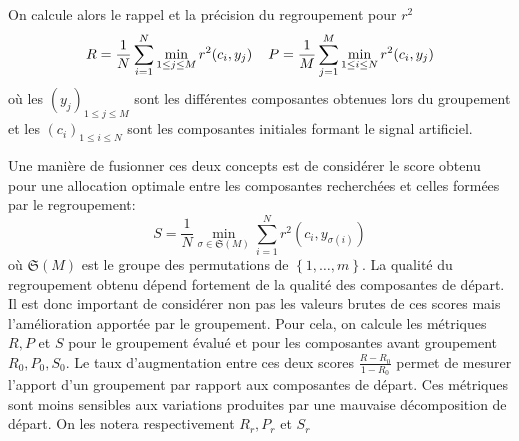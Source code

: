 \documentclass{gretsi}
\newcommand{\set}[1]{\left \{ 1, \dots, #1 \right \}}
\begin{document}
    On calcule alors le rappel et la précision du regroupement pour $r^2$
    \begin{equation}
        R = \frac{1}{N} \sum_{i=1}^N \min_{1\le j\le M} r^2(c_i, y_j) \hspace{0.4cm} P = \frac{1}{M}\sum_{j=1}^M \min_{1\le i\le N} r^2(c_i, y_j)
    \end{equation}
    où les $( y_j)_{1\le j \le M}$ sont les différentes composantes obtenues lors du groupement et les $(c_i)_{1\le i\le N}$ sont les composantes initiales formant le signal artificiel.
    
    Une manière de fusionner ces deux concepts est de considérer le score obtenu pour une allocation optimale entre les composantes recherchées et celles formées par le regroupement:
    \begin{equation}
        S =  \frac{1}{N} \min_{\sigma \in \mathfrak S(M)} \sum_{i=1}^N r^2(c_i, y_{\sigma(i)})
    \end{equation}
    où $\mathfrak S(M)$ est le groupe des permutations de $\set{m}$.
    La qualité du regroupement obtenu dépend fortement de la qualité des composantes de départ.
    Il est donc important de considérer non pas les valeurs brutes de ces scores mais l'amélioration apportée par le groupement.
    Pour cela, on calcule les métriques $R, P$ et $S$ pour le groupement évalué et pour les composantes avant groupement $R_0, P_0, S_0$.
    Le taux d'augmentation entre ces deux scores $\frac{R-R_0}{1-R_0}$ permet de mesurer l'apport d'un groupement par rapport aux composantes de départ.
    Ces métriques sont moins sensibles aux variations produites par une mauvaise décomposition de départ. On les notera respectivement $R_r, P_r$ et $S_r$
    

% 
    
\end{document}
